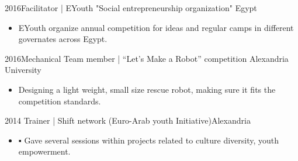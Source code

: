 \begin{extras}

  \extra
    {2016}{Facilitator |  EYouth "Social entrepreneurship organization" }{Egypt}
      {
                      \begin{itemize}
                         \item EYouth organize annual competition for ideas and regular camps in different governates across Egypt.
                      \end{itemize}
                    }
\extra
    {2016}{Mechanical Team member | “Let’s Make a Robot” competition }{Alexandria University}
      {
                      \begin{itemize}
                         \item Designing a light weight, small size  rescue robot, making sure it fits the competition standards.
                      \end{itemize}
                    }
    \extra
    {2014} {Trainer | Shift network (Euro-Arab youth Initiative)}{Alexandria}
           {
                      \begin{itemize}
                        \item ▪	Gave several sessions within projects related to culture diversity, youth empowerment.
                      \end{itemize}
                    }
\end{extras}
